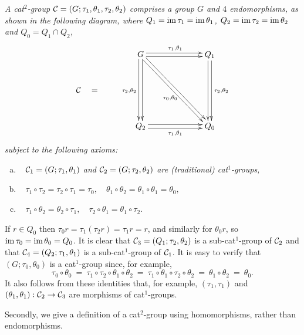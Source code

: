 \begin{defn} \label{defn:cat2a} 
\emph{A cat$^2$-group  $\mathcal{C} = (G;\tau_1,\theta_1,\tau_2,\theta_2)$  
comprises a group $G$ and $4$ endomorphisms, as shown in the following diagram, 
where $Q_1 = \mathrm{im}\,\tau_1 = \mathrm{im}\,\theta_1$, $Q_2 = \mathrm{im}\,\tau_2 = \mathrm{im}\,\theta_2$ 
and $Q_0 = Q_1 \cap Q_2$, }
\begin{equation} \label{eq:cat2-diag-a}
\vcenter{\xymatrix@R=30pt@C=30pt{
 & G \ar[dd] <+0.5ex>  \ar[dd] <-0.5ex>_{\tau_2,\theta_2}
     \ar[rr] <-0.5ex>  \ar[rr] <+0.5ex>^{\tau_1,\theta_1}
     \ar[ddrr] <-0.5ex>  \ar[ddrr] <+0.5ex>_(0.55){\tau_0,\theta_0}
    &&  Q_1 \ar[dd]<-0.5ex>  \ar[dd] <+0.5ex>^{\tau_2,\theta_2} \\ 
\calC \quad = \quad \\
 & Q_2 \ar[rr] <+0.5ex>  \ar[rr] <-0.5ex>_{\tau_1,\theta_1} 
    &&  Q_0 
 \\
}}
\end{equation}
\noindent
\emph{subject to the following axioms:}
\begin{enumerate}[(a)]
\item~
\emph{$\mathcal{C}_1 = (G;\tau_1,\theta_1)$ and $\mathcal{C}_2 = (G;\tau_2,\theta_2)$ 
are (traditional) cat$^1$-groups,}
\item~
$\tau_1 \circ \tau_2 = \tau_2 \circ \tau_1 = \tau_0, \quad  
 \theta_1 \circ \theta_2 = \theta_1 \circ \theta_1 = \theta_0,$  
\item~
$\tau_1 \circ \theta_2 = \theta_2 \circ \tau_1, \quad 
 \tau_2 \circ \theta_1 = \theta_1 \circ \tau_2.$ 
\end{enumerate}
\end{defn}

\noindent
If $r \in Q_0$ then $\tau_0r = \tau_1(\tau_2 r) = \tau_1r = r$, 
and similarly for $\theta_0r$, so $\mathrm{im}\,\tau_0 = \mathrm{im}\,\theta_0 = Q_0$. 
It is clear that $\mathcal{C}_3 = (Q_1;\tau_2,\theta_2)$ 
is a sub-cat$^1$-group of $\mathcal{C}_2$
and that $\mathcal{C}_4 = (Q_2;\tau_1,\theta_1)$ 
is a sub-cat$^1$-group of $\mathcal{C}_1$. 
It is easy to verify that $(G;\tau_0,\theta_0)$ is a cat$^1$-group since, 
for example, 
$$
\tau_0\circ\theta_0 ~=~ \tau_1\circ\tau_2\circ\theta_1\circ\theta_2 
                    ~=~ \tau_1\circ\theta_1\circ\tau_2\circ\theta_2 
                    ~=~ \theta_1\circ\theta_2 
                    ~=~ \theta_0.
$$
It also follows from these identities that, for example,  
$(\tau_1,\tau_1)$ and $(\theta_1,\theta_1) : \mathcal{C}_2 \to \mathcal{C}_3$ 
are morphisms of cat$^1$-groups. %

\medskip 
Secondly, we give a definition of a cat$^2$-group using homomorphisms, 
rather than endomorphisms. 

